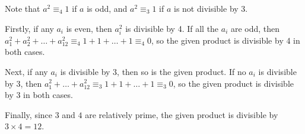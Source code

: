 Note that $a^2 \equiv_4 1$ if $a$ is odd, and $a^2 \equiv_3 1$ if $a$ is not divisible by 3. 

Firstly, if any $a_i$ is even, then $a_i^2$ is divisible by 4. If all the $a_i$ are odd, then $a_1^2 + a_2^2 + \dots +a_{12}^2 \equiv_4 1 + 1 + \dots + 1 \equiv_4 0$, so the given product is divisible by 4 in both cases. 

Next, if any $a_i$ is divisible by 3, then so is the given product. If no $a_i$ is divisible by 3, then $a_1^2+\dots+a_{12}^2 \equiv_{3} 1+1+\dots+1 \equiv_3 0$, so the given product is divisible by 3 in both cases.

Finally, since $3$ and $4$ are relatively prime, the given product is divisible by $3\times 4 = 12$. 